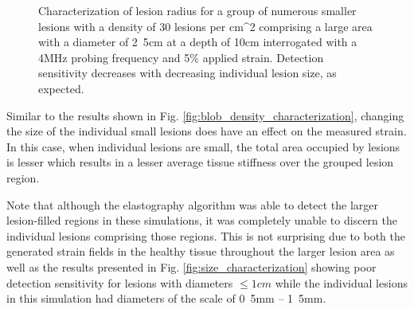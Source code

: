 			\begin{figure}[!t]
				\centering
				\caption[Clustered lesion radius characterization]{Characterization of lesion radius for a group of numerous smaller lesions with a density of 30 lesions per \unit{}{cm^2} comprising a large area with a diameter of \unit{2.5}{cm} at a depth of \unit{10}{cm} interrogated with a \unit{4}{MHz} probing frequency and \unit{5}{\%} applied strain. Detection sensitivity decreases with decreasing individual lesion size, as expected.}
				\label{fig:blob_radius_characterization}
			\end{figure}

			Similar to the results shown in Fig. \ref{fig:blob_density_characterization}, changing the size of the individual small lesions does have an effect on the measured strain. In this case, when individual lesions are small, the total area occupied by lesions is lesser which results in a lesser average tissue stiffness over the grouped lesion region.

			Note that although the elastography algorithm was able to detect the larger lesion-filled regions in these simulations, it was completely unable to discern the individual lesions comprising those regions. This is not surprising due to both the generated strain fields in the healthy tissue throughout the larger lesion area as well as the results presented in Fig. \ref{fig:size_characterization} showing poor detection sensitivity for lesions with diameters $\leq \unit{1}{cm}$ while the individual lesions in this simulation had diameters of the scale of \unit{0.5}{mm} -- \unit{1.5}{mm}.

